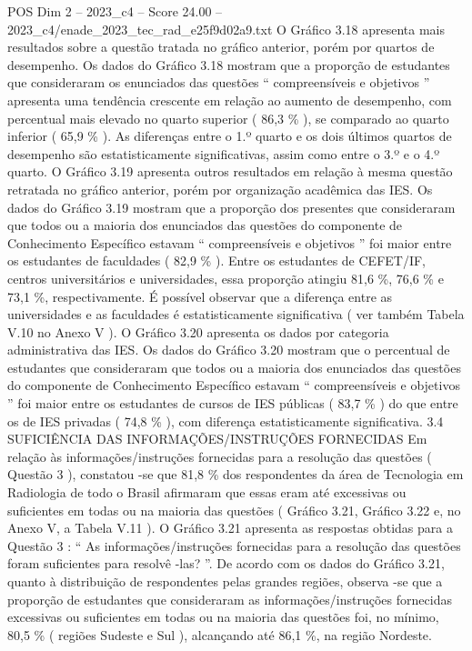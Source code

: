 \begin{textsample}{POS Dim 2 – 2023\_c4 – Score 24.00 – 2023\_c4/enade\_2023\_tec\_rad\_e25f9d02a9.txt}
O Gráfico 3.18 apresenta mais resultados sobre a questão tratada no gráfico anterior, porém por quartos de desempenho.
Os dados do Gráfico 3.18 mostram que a proporção de estudantes que consideraram os enunciados das questões “ compreensíveis e objetivos ” apresenta uma tendência crescente em relação ao aumento de desempenho, com percentual mais elevado no quarto superior ( 86,3 \% ), se comparado ao quarto inferior ( 65,9 \% ).
As diferenças entre o 1.º quarto e os dois últimos quartos de desempenho são estatisticamente significativas, assim como entre o 3.º e o 4.º quarto.
O Gráfico 3.19 apresenta outros resultados em relação à mesma questão retratada no gráfico anterior, porém por organização acadêmica das IES.
Os dados do Gráfico 3.19 mostram que a proporção dos presentes que consideraram que todos ou a maioria dos enunciados das questões do componente de Conhecimento Específico estavam “ compreensíveis e objetivos ” foi maior entre os estudantes de faculdades ( 82,9 \% ).
Entre os estudantes de CEFET/IF, centros universitários e universidades, essa proporção atingiu 81,6 \%, 76,6 \% e 73,1 \%, respectivamente.
É possível observar que a diferença entre as universidades e as faculdades é estatisticamente significativa ( ver também Tabela V.10 no Anexo V ).
O Gráfico 3.20 apresenta os dados por categoria administrativa das IES.
Os dados do Gráfico 3.20 mostram que o percentual de estudantes que consideraram que todos ou a maioria dos enunciados das questões do componente de Conhecimento Específico estavam “ compreensíveis e objetivos ” foi maior entre os estudantes de cursos de IES públicas ( 83,7 \% ) do que entre os de IES privadas ( 74,8 \% ), com diferença estatisticamente significativa. 3.4 SUFICIÊNCIA DAS INFORMAÇÕES/INSTRUÇÕES FORNECIDAS Em relação às informações/instruções fornecidas para a resolução das questões ( Questão 3 ), constatou -se que 81,8 \% dos respondentes da área de Tecnologia em Radiologia de todo o Brasil afirmaram que essas eram até excessivas ou suficientes em todas ou na maioria das questões ( Gráfico 3.21, Gráfico 3.22 e, no Anexo V, a Tabela V.11 ).
O Gráfico 3.21 apresenta as respostas obtidas para a Questão 3 : “ As informações/instruções fornecidas para a resolução das questões foram suficientes para resolvê -las? ”.
De acordo com os dados do Gráfico 3.21, quanto à distribuição de respondentes pelas grandes regiões, observa -se que a proporção de estudantes que consideraram as informações/instruções fornecidas excessivas ou suficientes em todas ou na maioria das questões foi, no mínimo, 80,5 \% ( regiões Sudeste e Sul ), alcançando até 86,1 \%, na região Nordeste.

\end{textsample}
